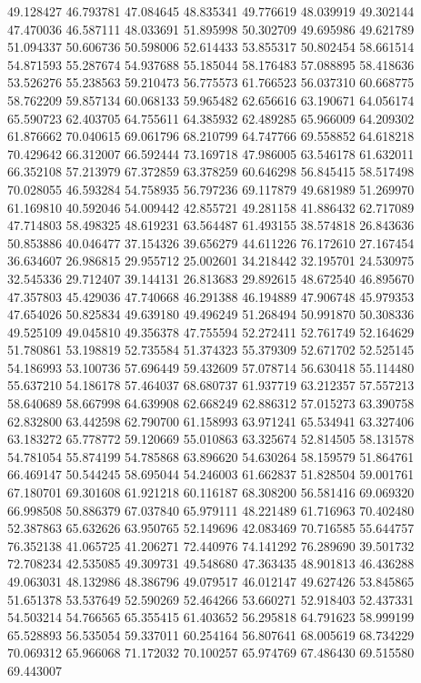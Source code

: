 49.128427
46.793781
47.084645
48.835341
49.776619
48.039919
49.302144
47.470036
46.587111
48.033691
51.895998
50.302709
49.695986
49.621789
51.094337
50.606736
50.598006
52.614433
53.855317
50.802454
58.661514
54.871593
55.287674
54.937688
55.185044
58.176483
57.088895
58.418636
53.526276
55.238563
59.210473
56.775573
61.766523
56.037310
60.668775
58.762209
59.857134
60.068133
59.965482
62.656616
63.190671
64.056174
65.590723
62.403705
64.755611
64.385932
62.489285
65.966009
64.209302
61.876662
70.040615
69.061796
68.210799
64.747766
69.558852
64.618218
70.429642
66.312007
66.592444
73.169718
47.986005
63.546178
61.632011
66.352108
57.213979
67.372859
63.378259
60.646298
56.845415
58.517498
70.028055
46.593284
54.758935
56.797236
69.117879
49.681989
51.269970
61.169810
40.592046
54.009442
42.855721
49.281158
41.886432
62.717089
47.714803
58.498325
48.619231
63.564487
61.493155
38.574818
26.843636
50.853886
40.046477
37.154326
39.656279
44.611226
76.172610
27.167454
36.634607
26.986815
29.955712
25.002601
34.218442
32.195701
24.530975
32.545336
29.712407
39.144131
26.813683
29.892615
48.672540
46.895670
47.357803
45.429036
47.740668
46.291388
46.194889
47.906748
45.979353
47.654026
50.825834
49.639180
49.496249
51.268494
50.991870
50.308336
49.525109
49.045810
49.356378
47.755594
52.272411
52.761749
52.164629
51.780861
53.198819
52.735584
51.374323
55.379309
52.671702
52.525145
54.186993
53.100736
57.696449
59.432609
57.078714
56.630418
55.114480
55.637210
54.186178
57.464037
68.680737
61.937719
63.212357
57.557213
58.640689
58.667998
64.639908
62.668249
62.886312
57.015273
63.390758
62.832800
63.442598
62.790700
61.158993
63.971241
65.534941
63.327406
63.183272
65.778772
59.120669
55.010863
63.325674
52.814505
58.131578
54.781054
55.874199
54.785868
63.896620
54.630264
58.159579
51.864761
66.469147
50.544245
58.695044
54.246003
61.662837
51.828504
59.001761
67.180701
69.301608
61.921218
60.116187
68.308200
56.581416
69.069320
66.998508
50.886379
67.037840
65.979111
48.221489
61.716963
70.402480
52.387863
65.632626
63.950765
52.149696
42.083469
70.716585
55.644757
76.352138
41.065725
41.206271
72.440976
74.141292
76.289690
39.501732
72.708234
42.535085
49.309731
49.548680
47.363435
48.901813
46.436288
49.063031
48.132986
48.386796
49.079517
46.012147
49.627426
53.845865
51.651378
53.537649
52.590269
52.464266
53.660271
52.918403
52.437331
54.503214
54.766565
65.355415
61.403652
56.295818
64.791623
58.999199
65.528893
56.535054
59.337011
60.254164
56.807641
68.005619
68.734229
70.069312
65.966068
71.172032
70.100257
65.974769
67.486430
69.515580
69.443007
